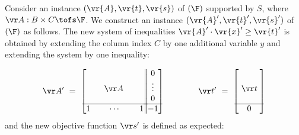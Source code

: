 %
Consider an instance $(\vr{A},\vr{t},\vr{s})$ of \finineqmaxname$(\F)$ supported by $S$,
where $\vr A : B\times C\tofs \F$.
We construct an instance $(\vr{A}',\vr{t}',\vr{s}')$ of \ineqmaxname$(\F)$ as follows.
The new system of inequalities
$\vr{A}' \cdot \vr{x}' \geq \vr{t}'$ is obtained by
extending the column index $C$ by one additional variable $y$ and extending the system by one inequality:

\vspace{-2mm}
\begin{align*}
\vr A' \ = \ 
\left[
\begin{matrix}
  & & \phantom{0}  \\  & \ \ \vr A \ \ \phantom{\vdots} &     \\     &  & \phantom{0} \\ \hline
  1 & \cdots & 1
\end{matrix}
\right\rvert
\hspace{-1.25mm}
\left\rvert
\begin{matrix}
  0 \\     \vdots \\   0 \\       \hline -1
\end{matrix}
\right]
\qquad\qquad
\vr t' \ = \ \begin{bmatrix}
\phantom{0} \\ \ \vr t \phantom{\vdots} \\ \phantom{0} \\ \hline 0 
\end{bmatrix}
\end{align*}
%
and the new objective function $\vr s'$ is defined as expected:

